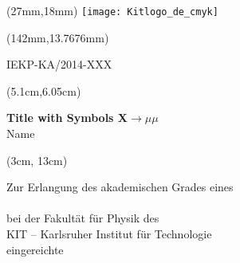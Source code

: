 \newcommand{\diameter}{8mm}
\newcommand{\rand}{10mm}
\newcommand{\bkorr}{10mm} %
\newcommand{\xone}{-1.0in-\oddsidemargin+\rand+\bkorr-3.8mm}
\newcommand{\xtwo}{1.0\textwidth+2.0\oddsidemargin+1.0in-\rand+1.5mm}
\newcommand{\yone}{\topmargin+\headheight+\headsep+1.0in+11pt-\rand}
\newcommand{\ytwo}{-1.0\textheight-2.0\topmargin-1.0in-\footskip+\rand-4.4mm}

\newcommand{\rahmen}{%
\begin{tikzpicture}[overlay]
\draw[color=gray]
  (\xone, \yone) -- (\xtwo - \diameter, \yone)
  arc (90:0:\diameter)
  -- (\xtwo, \ytwo)
  -- (\xone + \diameter, \ytwo)
  arc (270:180:\diameter)
  -- (\xone, \yone);
\end{tikzpicture}
}

\begin{titlepage}
\large %
\begin{textblock*}{\textwidth}(27mm,18mm) %
		\texttt{[image: Kitlogo\_de\_cmyk]}
\end{textblock*}
\begin{textblock*}{5cm}(142mm,13.7676mm)%
\begin{flushright}
\small
IEKP-KA/2014-XXX
\end{flushright}
\end{textblock*}

\begin{textblock*}{10.8cm}(5.1cm,6.05cm) %
\begin{center}
\LARGE \textsf{\textbf{%
Title with Symbols X\boldmath${}\to\mu\mu$}}\\[1cm]
\Large Name
\end{center}
\end{textblock*}

\begin{textblock*}{15cm}(3cm, 13cm) %
\begin{center}
Zur Erlangung des akademischen Grades eines\\[0.5ex]
\\[0.5ex]
bei der Fakultät für Physik des\\
KIT -- Karlsruher Institut für Technologie\\[0.5cm]

eingereichte\\[0.5cm]


\end{center}
\end{textblock*}
\end{titlepage}
